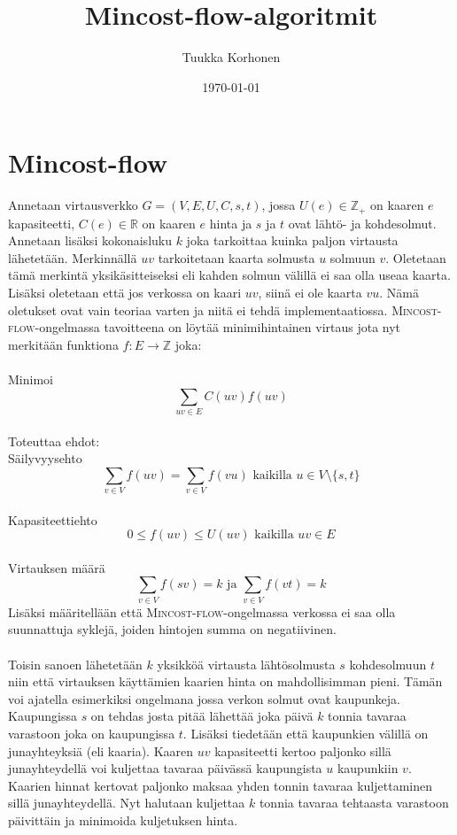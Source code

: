 \documentclass[a4paper, 11pt]{article}
\title{Mincost-flow-algoritmit}
\author{Tuukka Korhonen}
\date{\today}
\begin{document}
\maketitle
\noindent
\section*{Mincost-flow}
Annetaan virtausverkko $G = (V, E, U, C, s, t)$, jossa $U(e) \in \mathbb{Z_+}$ on 
kaaren $e$ kapasiteetti, $C(e) \in \mathbb{R}$ on kaaren $e$ hinta ja $s$ ja $t$
ovat lähtö- ja kohdesolmut. Annetaan lisäksi kokonaisluku $k$ joka tarkoittaa
kuinka paljon virtausta lähetetään. Merkinnällä $uv$ tarkoitetaan kaarta solmusta
$u$ solmuun $v$. Oletetaan tämä merkintä yksikäsitteiseksi eli 
kahden solmun välillä ei
saa olla useaa kaarta. Lisäksi oletetaan että jos verkossa on kaari $uv$, siinä
ei ole kaarta $vu$. Nämä oletukset ovat vain teoriaa varten ja niitä ei tehdä
implementaatiossa. \textsc{Mincost-flow}-ongelmassa tavoitteena on löytää minimihintainen virtaus jota 
nyt merkitään funktiona
$f : E \rightarrow \mathbb{Z}$ joka: \\\\ Minimoi $$\sum_{uv \in E} C(uv) f(uv)$$\\
Toteuttaa ehdot:\\ Säilyvyysehto
$$\sum_{v \in V} f(uv) = \sum_{v \in V} f(vu) \text{ kaikilla } u \in V \setminus \{s, t\}$$
\\Kapasiteettiehto
$$0 \le f(uv) \le U(uv) \text{ kaikilla } uv \in E$$
\\Virtauksen määrä
$$\sum_{v \in V} f(sv) = k \text{ ja } \sum_{v \in V} f(vt) = k$$
Lisäksi määritellään että \textsc{Mincost-flow}-ongelmassa verkossa ei saa olla
suunnattuja syklejä, joiden hintojen summa on negatiivinen.\\\\

\noindent
Toisin sanoen lähetetään $k$ yksikköä virtausta lähtösolmusta $s$ kohdesolmuun $t$ niin
että virtauksen käyttämien kaarien hinta on mahdollisimman pieni. Tämän voi ajatella
esimerkiksi ongelmana jossa verkon solmut ovat kaupunkeja. Kaupungissa $s$ on tehdas
josta pitää lähettää joka päivä $k$ tonnia tavaraa varastoon joka on kaupungissa $t$.
Lisäksi tiedetään että kaupunkien välillä on junayhteyksiä (eli kaaria). Kaaren $uv$
kapasiteetti kertoo paljonko sillä junayhteydellä voi kuljettaa tavaraa päivässä
kaupungista $u$ kaupunkiin $v$. Kaarien hinnat kertovat paljonko maksaa yhden tonnin
tavaraa kuljettaminen sillä junayhteydellä. Nyt halutaan kuljettaa $k$ tonnia tavaraa
tehtaasta varastoon päivittäin ja minimoida  kuljetuksen hinta.\\\\
\end{document}
